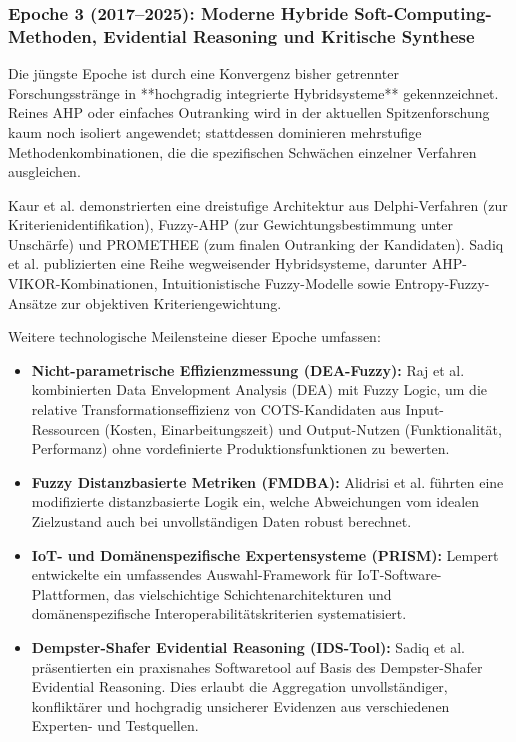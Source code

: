 \subsubsection{Epoche 3 (2017--2025): Moderne Hybride Soft-Computing-Methoden, Evidential Reasoning und Kritische Synthese}

Die jüngste Epoche ist durch eine Konvergenz bisher getrennter Forschungsstränge in **hochgradig integrierte Hybridsysteme** gekennzeichnet. Reines AHP oder einfaches Outranking wird in der aktuellen Spitzenforschung kaum noch isoliert angewendet; stattdessen dominieren mehrstufige Methodenkombinationen, die die spezifischen Schwächen einzelner Verfahren ausgleichen.

Kaur et al. \cite{NZJEEPAC} demonstrierten eine dreistufige Architektur aus Delphi-Verfahren (zur Kriterienidentifikation), Fuzzy-AHP (zur Gewichtungsbestimmung unter Unschärfe) und PROMETHEE (zum finalen Outranking der Kandidaten). Sadiq et al. \cite{QNWK8SAP, JT5X3FIG, DFASRUVC} publizierten eine Reihe wegweisender Hybridsysteme, darunter AHP-VIKOR-Kombinationen, Intuitionistische Fuzzy-Modelle sowie Entropy-Fuzzy-Ansätze zur objektiven Kriteriengewichtung.

Weitere technologische Meilensteine dieser Epoche umfassen:
\begin{itemize}
    \item \textbf{Nicht-parametrische Effizienzmessung (DEA-Fuzzy):} Raj et al. \cite{YVWGHAWQ} kombinierten Data Envelopment Analysis (DEA) mit Fuzzy Logic, um die relative Transformationseffizienz von COTS-Kandidaten aus Input-Ressourcen (Kosten, Einarbeitungszeit) und Output-Nutzen (Funktionalität, Performanz) ohne vordefinierte Produktionsfunktionen zu bewerten.
    \item \textbf{Fuzzy Distanzbasierte Metriken (FMDBA):} Alidrisi et al. \cite{FVINCQ89} führten eine modifizierte distanzbasierte Logik ein, welche Abweichungen vom idealen Zielzustand auch bei unvollständigen Daten robust berechnet.
    \item \textbf{IoT- und Domänenspezifische Expertensysteme (PRISM):} Lempert \cite{RRU375GB} entwickelte ein umfassendes Auswahl-Framework für IoT-Software-Plattformen, das vielschichtige Schichtenarchitekturen und domänenspezifische Interoperabilitätskriterien systematisiert.
    \item \textbf{Dempster-Shafer Evidential Reasoning (IDS-Tool):} Sadiq et al. \cite{LNQHES84} präsentierten ein praxisnahes Softwaretool auf Basis des Dempster-Shafer Evidential Reasoning. Dies erlaubt die Aggregation unvollständiger, konfliktärer und hochgradig unsicherer Evidenzen aus verschiedenen Experten- und Testquellen.
\end{itemize}

